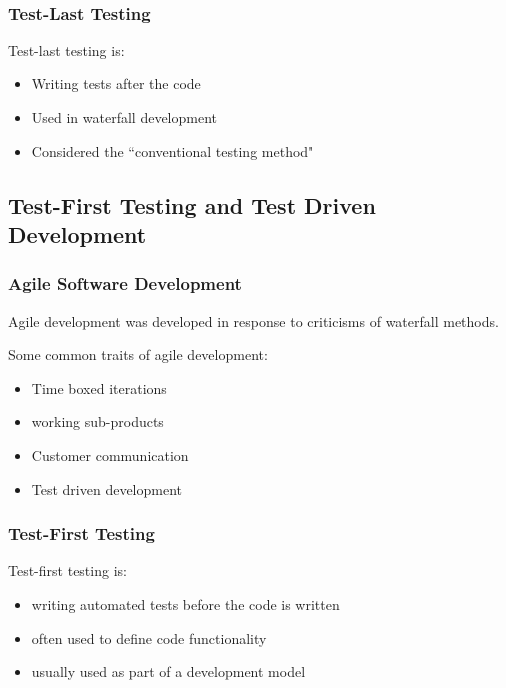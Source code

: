 \documentclass{beamer}
\newcommand{\linespace}{\vskip 0.25cm}
\begin{document}
\begin{frame}
\begin{columns}
\begin{column}{0.6\textwidth}
\\
\end{column}
\end{columns}
\end{frame}

\begin{frame}
\frametitle{Test-Last Testing}
Test-last testing is:
\begin{itemize}
\linespace
\item Writing tests after the code
\linespace
\item Used in waterfall development
\linespace
\item Considered the ``conventional testing method"
\end{itemize}
\end{frame}

\subsection{Test-First Testing and Test Driven Development}

\begin{frame}
\frametitle{Agile Software Development}
Agile development was developed in response to criticisms of waterfall methods.

\linespace

Some common traits of agile development:
\begin{itemize}
\item Time boxed iterations
\item working sub-products
\item Customer communication
\item Test driven development
\end{itemize}
\end{frame}

\begin{frame}
\frametitle{Test-First Testing}
Test-first testing is:
\begin{itemize}
\linespace
\item writing automated tests before the code is written
\linespace
\item often used to define code functionality
\linespace
\item usually used as part of a development model 
\end{itemize}
\end{frame}
\end{document}
